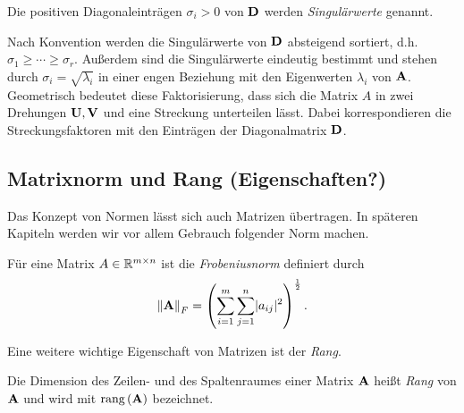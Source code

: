 \begin{defn}[Singulärwert]
Die positiven Diagonaleinträgen $\sigma_{i} > 0$ von $\mathbf{D}$ werden \textit{Singulärwerte} genannt.
\end{defn}

Nach Konvention werden die Singulärwerte von $\mathbf{D}$ absteigend sortiert, d.h. $\sigma _{1} \geq \cdots \geq \sigma _{r}$. Außerdem sind die Singulärwerte eindeutig bestimmt und stehen durch $\sigma_i = \sqrt{\lambda_i}$ in einer engen Beziehung mit den Eigenwerten $\lambda_i$ von $\mathbf{A}$. Geometrisch bedeutet diese Faktorisierung, dass sich die Matrix $A$ in zwei Drehungen $\mathbf{U}, \mathbf{V}$ und eine Streckung unterteilen lässt. Dabei korrespondieren die Streckungsfaktoren mit den Einträgen der Diagonalmatrix $\mathbf{D}$.


\subsection{Matrixnorm und Rang (Eigenschaften?)}

Das Konzept von Normen lässt sich auch Matrizen übertragen. In späteren Kapiteln werden wir vor allem Gebrauch folgender Norm machen.

\begin{defn}
Für eine Matrix $A \in \mathbb{R}^{m \times n}$ ist die \textit{Frobeniusnorm} definiert durch
$$\left\lVert \mathbf{A} \right\rVert_F = \left( \sum_{i=1}^{m} \sum_{j=1}^{n} \lvert a_{ij} \rvert ^{2} \right) ^{\frac{1}{2}}.$$
\end{defn}

Eine weitere wichtige Eigenschaft von Matrizen ist der \textit{Rang}.

\begin{defn}
Die Dimension des Zeilen- und des Spaltenraumes einer Matrix $\mathbf{A}$ heißt \textit{Rang} von $\mathbf{A}$ und wird mit $\text{rang} \left( \mathbf{A} \right)$ bezeichnet.
\end{defn}

